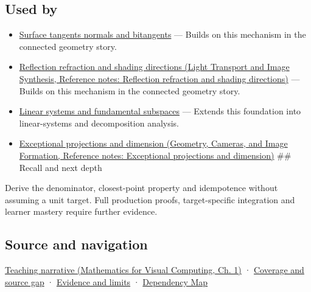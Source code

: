 \subsection{Used by}\label{appendix-505a502c372a-used-by}

\hypertarget{appendix-505a502c372a-used-by}{}

\begin{itemize}
\item
  \hyperref[appendix-e31893dec985]{Surface tangents normals and bitangents} --- Builds on this mechanism in the connected geometry story.
\item
  \href{../04-Light-Transport-and-Image-Synthesis/main.pdf\#nameddest=appendix-44e00863b4d5}{Reflection refraction and shading directions (Light Transport and Image Synthesis, Reference notes: Reflection refraction and shading directions)} --- Builds on this mechanism in the connected geometry story.
\item
  \hyperref[appendix-8572a4a060c1]{Linear systems and fundamental subspaces} --- Extends this foundation into linear-systems and decomposition analysis.
\item
  \href{../03-Geometry-Cameras-and-Image-Formation/main.pdf\#nameddest=appendix-3c73f7862157}{Exceptional projections and dimension (Geometry, Cameras, and Image Formation, Reference notes: Exceptional projections and dimension)} \#\# Recall and next depth
\end{itemize}

Derive the denominator, closest-point property and idempotence without assuming a unit target. Full production proofs, target-specific integration and learner mastery require further evidence.

\subsection{Source and navigation}\label{appendix-505a502c372a-source-and-navigation}

\hypertarget{appendix-505a502c372a-source-and-navigation}{}

\href{../02-Mathematics-for-Visual-Computing/main.pdf\#nameddest=01-foundations-i-ch017-projection-separates-useful-movement-from-sideways-movement}{Teaching narrative (Mathematics for Visual Computing, Ch. 1)} · \hyperref[appendix-fd090d982a15-phase-6---parts-501-600]{Coverage and source gap} · \hyperref[appendix-a103e7846d21-phase-6---source-analysis-and-verification]{Evidence and limits} · \hyperref[appendix-4ad47bdd269a]{Dependency Map}
